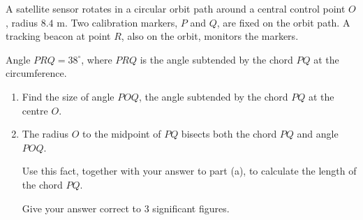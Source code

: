 \begin{question}
\noindent A satellite sensor rotates in a circular orbit path around a central control point $O$, radius $8.4$ m. Two calibration markers, $P$ and $Q$, are fixed on the orbit path. A tracking beacon at point $R$, also on the orbit, monitors the markers.

\noindent Angle $PRQ = 38^\circ$, where $PRQ$ is the angle subtended by the chord $PQ$ at the circumference.

\begin{center}
\end{center}

\begin{enumerate}
    \item[(a)] Find the size of angle $POQ$, the angle subtended by the chord $PQ$ at the centre $O$.
    \vspace{2.5cm}

    \item[(b)] The radius $O$ to the midpoint of $PQ$ bisects both the chord $PQ$ and angle $POQ$.

    Use this fact, together with your answer to part (a), to calculate the length of the chord $PQ$.

    Give your answer correct to 3 significant figures.
    \vspace{5cm}
\end{enumerate}
\end{question}